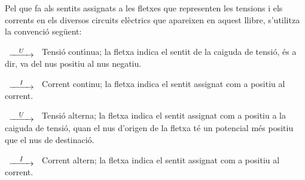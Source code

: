 Pel que fa als sentits assignats a les fletxes que representen les
tensions i els corrents en els diversos circuits el\`{e}ctrics que
apareixen en aquest llibre, s'utilitza la convenci\'{o} seg\"{u}ent:

\begin{list}{}
{\setlength{\labelwidth}{15mm} \setlength{\leftmargin}{20mm}
\setlength{\labelsep}{5mm}}
    \item[$\begin{CD} @>U>> \end{CD}$] Tensi\'{o} cont\'{\i}nua; la fletxa indica el sentit
    de la caiguda de tensi\'{o}, \'{e}s a dir, va del nus positiu al nus negatiu.
    \item[$\begin{CD} @>I>> \end{CD}$] Corrent
    continu; la fletxa indica el sentit  assignat com a positiu al corrent.
    \item[$\begin{CD} @>\cmplx{U}>> \end{CD}$] Tensi\'{o} alterna; la fletxa indica el
    sentit assignat com a positiu a la caiguda de tensi\'{o}, quan el nus d'origen de la fletxa
    t\'{e} un potencial  m\'{e}s positiu que el nus de destinaci\'{o}.
    \item[$\begin{CD} @>\cmplx{I}>> \end{CD}$] Corrent altern; la fletxa
    indica el sentit  assignat com a positiu al corrent.
\end{list}

\pagebreak

